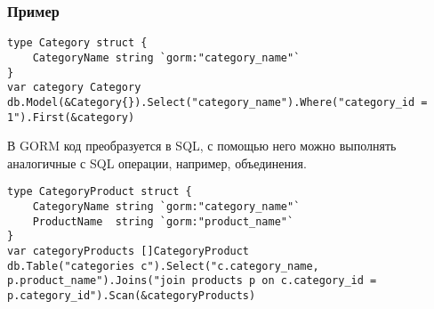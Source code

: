 \begin{appendices}
\subsubsection*{Пример}

\begin{lstlisting}[label=orm-syntax-ex-1,caption=Пример запроса на ORM]
type Category struct {
	CategoryName string `gorm:"category_name"`
}
var category Category
db.Model(&Category{}).Select("category_name").Where("category_id = 1").First(&category)
\end{lstlisting}

В GORM код преобразуется в SQL, с помощью него можно выполнять аналогичные с SQL операции, например, объединения.

\begin{lstlisting}[label=orm-syntax-ex-2,caption=Пример запроса с объединением на ORM]
type CategoryProduct struct {
	CategoryName string `gorm:"category_name"`
	ProductName  string `gorm:"product_name"`
}
var categoryProducts []CategoryProduct
db.Table("categories c").Select("c.category_name, p.product_name").Joins("join products p on c.category_id = p.category_id").Scan(&categoryProducts)
\end{lstlisting}

\end{appendices}
